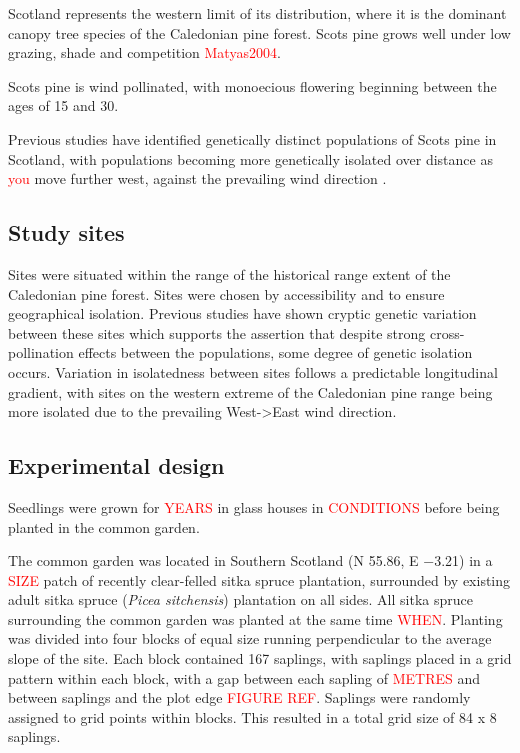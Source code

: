 \documentclass[a4paper, 11pt]{article}
\newcommand{\todo}[1]{\textcolor{red}{#1}}   %
\begin{document}
Scotland represents the western limit of its distribution, where it is the dominant canopy tree species of the Caledonian pine forest. Scots pine grows well under low grazing, shade and competition \todo{Matyas2004}. 

Scots pine is wind pollinated, with monoecious flowering beginning between the ages of 15 and 30. 

Previous studies have identified genetically distinct populations of Scots pine in Scotland, with populations becoming more genetically isolated over distance as \todo{you} move further west, against the prevailing wind direction \citep{}. 

\subsection*{Study sites}

Sites were situated within the range of the historical range extent of the Caledonian pine forest. Sites were chosen by accessibility and to ensure geographical isolation. Previous studies have shown cryptic genetic variation between these sites \citep{Donnelly2018} which supports the assertion that despite strong cross-pollination effects between the populations, some degree of genetic isolation occurs. Variation in isolatedness between sites follows a predictable longitudinal gradient, with sites on the western extreme of the Caledonian pine range being more isolated due to the prevailing West->East wind direction.

\subsection*{Experimental design}

Seedlings were grown for \todo{YEARS} in glass houses in \todo{CONDITIONS} before being planted in the common garden.

The common garden was located in Southern Scotland (N 55.86\textdegree{}, E −3.21\textdegree{}) in a \todo{SIZE} patch of recently clear-felled sitka spruce plantation, surrounded by existing adult sitka spruce (\textit{Picea sitchensis}) plantation on all sides. All sitka spruce surrounding the common garden was planted at the same time \todo{WHEN}. Planting was divided into four blocks of equal size running perpendicular to the average slope of the site. Each block contained 167 saplings, with saplings placed in a grid pattern within each block, with a gap between each sapling of \todo{METRES} and between saplings and the plot edge \todo{FIGURE REF}. Saplings were randomly assigned to grid points within blocks. This resulted in a total grid size of 84 x 8 saplings.
\end{document}
